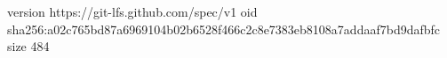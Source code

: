 version https://git-lfs.github.com/spec/v1
oid sha256:a02c765bd87a6969104b02b6528f466c2c8e7383eb8108a7addaaf7bd9dafbfc
size 484
